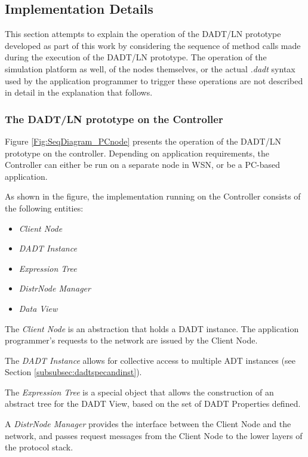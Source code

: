 \subsection{Implementation Details}

This section attempts to explain the operation of the DADT/LN prototype
developed as part of this work by considering the sequence of method calls made
during the execution of the DADT/LN prototype. The operation of the simulation platform as well, of the
nodes themselves, or the actual
\emph{.dadt} syntax used by the application programmer to trigger these
operations are not described in detail in the explanation that follows. 

\subsubsection{The DADT/LN prototype on the Controller}

Figure \ref{Fig:SeqDiagram_PCnode} presents the operation of the DADT/LN
prototype on the controller. 
Depending on application requirements, the Controller can either be run on a separate
node in WSN, or be a PC-based application.

As shown in the figure, the implementation running on the Controller consists of
the following entities:

\begin{itemize}
  \item \emph{Client Node}
  \item \emph{DADT Instance}
  \item \emph{Expression Tree} 
  \item \emph{DistrNode Manager} 
  \item \emph{Data View} 
\end{itemize}

The \emph{Client Node} is an abstraction that holds a DADT
instance. The application programmer's requests to the network are issued
by the Client Node.
  
The \emph{DADT Instance} allows for collective access to multiple ADT instances (see Section \ref{subsubsec:dadtspecandinst}).

The \emph{Expression Tree} is a special object that allows the construction of an abstract
tree for the DADT View, based on the set of DADT Properties defined.

A \emph{DistrNode Manager} provides the interface between the Client Node and
the network, and passes request messages from the Client Node to the lower layers
of the protocol stack.

